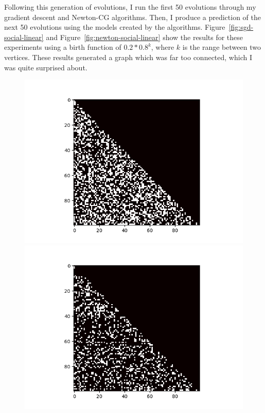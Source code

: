Following this generation of evolutions, I run the first 50 evolutions through my gradient descent and Newton-CG algorithms.
Then, I produce a prediction of the next 50 evolutions using the models created by the algorithms.
Figure~\ref{fig:sgd-social-linear} and Figure~\ref{fig:newton-social-linear} show the results for these experiments using a birth function of $0.2 * 0.8^k$, where $k$ is the range between two vertices.
These results generated a graph which was far too connected, which I was quite surprised about.

\begin{figure}
    \begin{minipage}{0.49\textwidth}
        \begin{center}
            \includegraphics[scale=0.5]{figures/original-square.png}
        \end{center}
    \end{minipage}
    \begin{minipage}{0.49\textwidth}
        \begin{center}
            \includegraphics[scale=0.5]{figures/scg-square.png}

\end{center}
\end{minipage}
\end{figure}
